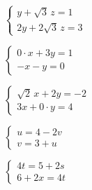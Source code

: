 \documentclass[12pt,a4paper]{article}
\begin{document}
\begin{exercise}
\begin{tasks}
\task $\begin{cases}
y + \sqrt{3}\,z = 1\\
2y + 2\sqrt{3}\,z = 3
\end{cases}$

\task $\begin{cases}
0\cdot x + 3y = 1\\
-x - y = 0
\end{cases}$

\task $\begin{cases}
\sqrt{2}\,x + 2y = -2\\
3x + 0\cdot y = 4
\end{cases}$

\task $\begin{cases}
u = 4 - 2v\\
v = 3 + u
\end{cases}$

\task $\begin{cases}
4t = 5 + 2s\\
6 + 2x = 4t
\end{cases}$

\end{tasks}
\end{exercise}
\end{document}

